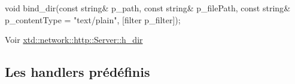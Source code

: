 \begin{DoxyItemize}
\item 
\begin{DoxyCode}
\textcolor{keywordtype}{void} bind\_dir(\textcolor{keyword}{const} \textcolor{keywordtype}{string}& p\_path,
              \textcolor{keyword}{const} \textcolor{keywordtype}{string}& p\_filePath,
              \textcolor{keyword}{const} \textcolor{keywordtype}{string}& p\_contentType = \textcolor{stringliteral}{"text/plain"},
              [filter            p\_filter]);
\end{DoxyCode}
 \par
\par
 Voir \hyperlink{classxtd_1_1network_1_1http_1_1Server_a71d7415223786f5451ef36f62c91782e}{xtd\-::network\-::http\-::\-Server\-::h\-\_\-dir} \par
\par

\end{DoxyItemize}

\subsection*{Les handlers prédéfinis }


